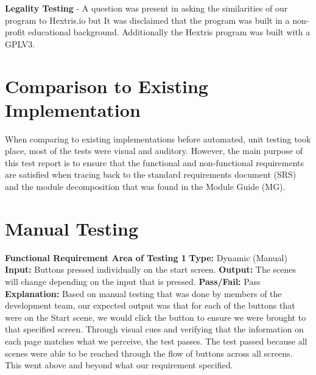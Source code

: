 \documentclass[12pt, titlepage]{article}
\begin{document}
\textbf{Legality Testing} - A question was present in asking the similarities of our program to Hextris.io but It was disclaimed that the program was built in a non-profit educational background. Additionally the Hextris program was built with a GPLV3.\\
	
\section{Comparison to Existing Implementation}	

    When comparing to existing implementations before automated, unit testing took place, most of the tests were visual and auditory. However, the main purpose of this test report is to ensure that the functional and non-functional requirements are satisfied when tracing back to the standard requirements document (SRS) and the module decomposition that was found in the Module Guide (MG). 



\section{Manual Testing}

    \noindent \textbf{Functional Requirement Area of Testing 1}
    \newline
    \textbf{Type:} Dynamic (Manual)
    \newline
    \textbf{Input:} Buttons pressed individually on the start screen.
    \newline
    \textbf{Output:} The scenes will change depending on the input that is pressed.
    \newline
    \textbf{Pass/Fail:} Pass
    \newline
    \textbf{Explanation:} Based on manual testing that was done by members of the development team, our expected output was that for each of the buttons that were on the Start scene, we would click the button to ensure we were brought to that specified screen. Through visual cues and verifying that the information on each page matches what we perceive, the test passes. The test passed because all scenes were able to be reached through the flow of buttons across all screens. This went above and beyond what our requirement specified.\newline \newline
    
\end{document}
